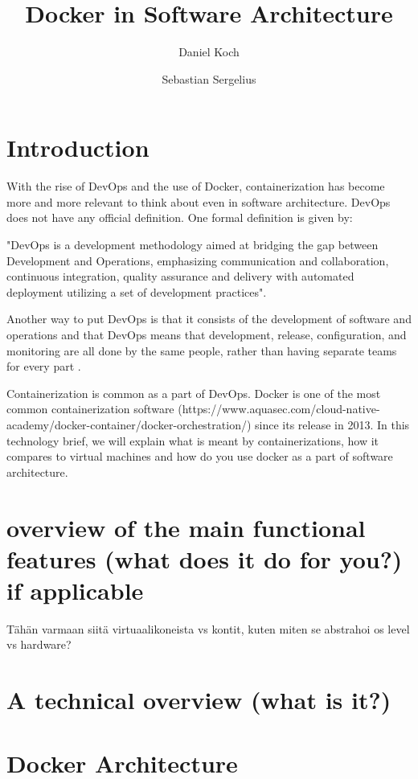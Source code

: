 \documentclass[fleqn,12pt]{olplainarticle}
\title{Docker in Software Architecture}
\author[1]{Daniel Koch}
\author[2]{Sebastian Sergelius}
\affil[1]{daniel.koch@helsinki.fi}
\affil[2]{github.com/sebazai}
\begin{document}
\flushbottom
\maketitle
\thispagestyle{empty}

\section{Introduction}

With the rise of DevOps and the use of Docker, containerization has become more and more relevant to think about even
in software architecture. DevOps does not have any official definition.
One formal definition is given by\cite{Jabbari_devops}: 
\begin{displayquote}
"DevOps is a development methodology aimed at bridging the gap between Development and Operations, emphasizing communication and collaboration, continuous integration, quality assurance and delivery with automated deployment utilizing a set of development practices".
\end{displayquote}
Another way to put DevOps is that it consists of the development of software and operations and that DevOps means that development, release, configuration, and monitoring are all done by the same people, rather than having separate teams for every part \citep{hy:DevOps_with_Docker}.

Containerization is common as a part of DevOps. Docker is one of the most common containerization software (https://www.aquasec.com/cloud-native-academy/docker-container/docker-orchestration/) since its release in 2013. In this technology brief, we will explain what is meant by containerizations, how it compares to virtual machines and how do you use docker as a part of software architecture.


\section{overview of the main functional features (what does it do for you?) if applicable}

Tähän varmaan siitä virtuaalikoneista vs kontit, kuten miten se abstrahoi os level vs hardware?

\section{A technical overview (what is it?)}

\section{Docker Architecture}
\end{document}
